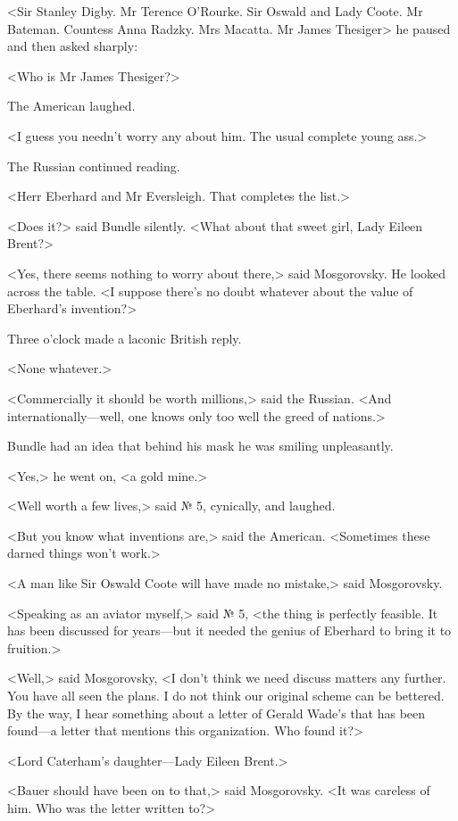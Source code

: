 <Sir Stanley Digby. Mr Terence O'Rourke. Sir Oswald and Lady Coote. Mr Bateman. Countess Anna Radzky. Mrs Macatta. Mr James Thesiger\longdash> he paused and then asked sharply:

<Who is Mr James Thesiger?>

The American laughed.

<I guess you needn't worry any about him. The usual complete young ass.>

The Russian continued reading.

<Herr Eberhard and Mr Eversleigh. That completes the list.>

<Does it?> said Bundle silently. <What about that sweet girl, Lady Eileen Brent?>

<Yes, there seems nothing to worry about there,> said Mosgorovsky. He looked across the table. <I suppose there's no doubt whatever about the value of Eberhard's invention?>

Three o'clock made a laconic British reply.

<None whatever.>

<Commercially it should be worth millions,> said the Russian. <And internationally—well, one knows only too well the greed of nations.>

Bundle had an idea that behind his mask he was smiling unpleasantly.

<Yes,> he went on, <a gold mine.>

<Well worth a few lives,> said № 5, cynically, and laughed.

<But you know what inventions are,> said the American. <Sometimes these darned things won't work.>

<A man like Sir Oswald Coote will have made no mistake,> said Mosgorovsky.

<Speaking as an aviator myself,> said № 5, <the thing is perfectly feasible. It has been discussed for years—but it needed the genius of Eberhard to bring it to fruition.>

<Well,> said Mosgorovsky, <I don't think we need discuss matters any further. You have all seen the plans. I do not think our original scheme can be bettered. By the way, I hear something about a letter of Gerald Wade's that has been found—a letter that mentions this organization. Who found it?>

<Lord Caterham's daughter—Lady Eileen Brent.>

<Bauer should have been on to that,> said Mosgorovsky. <It was careless of him. Who was the letter written to?>


